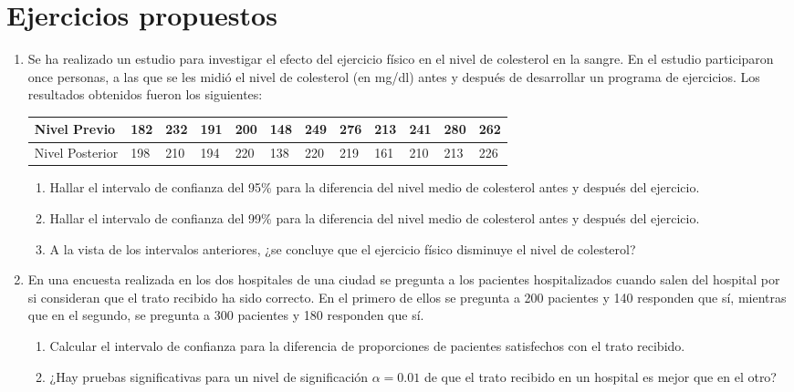 \section{Ejercicios propuestos}
\begin{enumerate}[leftmargin=*] 
\item  Se ha realizado un estudio para investigar el efecto del ejercicio físico en el nivel de colesterol en la sangre. En el estudio
participaron once personas, a las que se les midió el nivel de colesterol (en mg/dl) antes y después de desarrollar un programa de
ejercicios. Los resultados obtenidos fueron los siguientes:
\begin{center}
\begin{tabular}{|l|l|l|l|l|l|l|l|l|l|l|l|}
\hline
Nivel Previo & 182 & 232 & 191 & 200 & 148 & 249 & 276 & 213 & 241 & 280 & 262 \\
\hline
Nivel Posterior & 198 & 210 & 194 & 220 & 138 & 220 & 219 & 161 & 210 & 213 & 226 \\
\hline
\end{tabular}
\end{center}

\begin{enumerate}
\item Hallar el intervalo de confianza del 95\% para la diferencia del nivel medio de colesterol antes y después del
ejercicio.
\item Hallar el intervalo de confianza del 99\% para la diferencia del nivel medio de colesterol antes y después del
ejercicio.
\item A la vista de los intervalos anteriores, ¿se concluye que el ejercicio físico disminuye el nivel de colesterol?
\end {enumerate}

\item En una encuesta realizada en los dos hospitales de una ciudad se pregunta a los pacientes hospitalizados cuando salen del hospital por
si consideran que el trato recibido ha sido correcto. En el primero de ellos se pregunta a 200 pacientes y 140 responden que sí, mientras
que en el segundo, se pregunta a 300 pacientes y 180 responden que sí.

\begin{enumerate}
\item Calcular el intervalo de confianza para la diferencia de proporciones de pacientes satisfechos con el trato recibido.
\item ¿Hay pruebas significativas para un nivel de significación $\alpha=0.01$ de que el trato recibido en un hospital es mejor que en el
otro?
\end{enumerate}


\end{enumerate}
